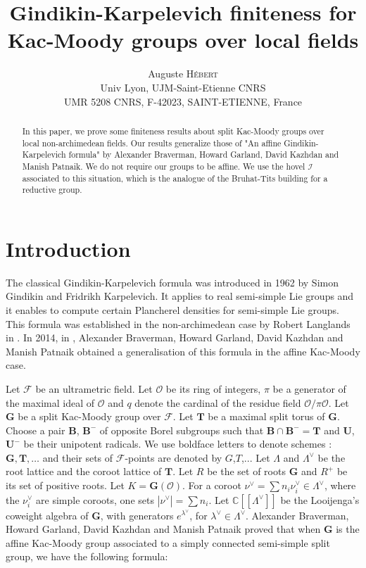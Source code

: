 \documentclass[12pt]{article}
\date{}
\title{Gindikin-Karpelevich finiteness for Kac-Moody groups over local fields}
\author{Auguste \textsc{Hébert} \\Univ Lyon, UJM-Saint-Etienne CNRS\\ UMR 5208 CNRS, F-42023, SAINT-ETIENNE, France}
\theoremstyle{plain}
\theoremstyle{definition}
\newcommand{\C}{\mathbb{C}}
\newcommand{\I}{\mathcal{I}}
\begin{document}
\maketitle



\begin{abstract}
In this paper, we prove some finiteness results about split Kac-Moody groups over  local non-archimedean fields. Our results generalize those of "An affine Gindikin-Karpelevich formula" by Alexander Braverman, Howard Garland, David Kazhdan and Manish Patnaik. We do not require our groups to be affine. We use the hovel $\I$ associated to this situation, which is the analogue of the Bruhat-Tits building for a reductive group.
\end{abstract}
 


\section{Introduction}
The classical Gindikin-Karpelevich formula was introduced in 1962 by Simon Gindikin and Fridrikh Karpelevich. It applies to real semi-simple Lie groups and it enables to compute certain Plancherel densities for semi-simple Lie groups. This formula was established in the non-archimedean case by Robert Langlands in \cite{langlands1971euler}. In 2014, in \cite{braverman2014affine}, Alexander Braverman, Howard Garland, David Kazhdan and Manish Patnaik obtained a generalisation of this formula in the affine Kac-Moody case. 


Let $\mathcal{F}$ be an ultrametric field. Let $\mathcal{O}$ be its ring of integers, $\pi$ be a generator of the maximal ideal of $\mathcal{O}$ and $q$ denote the cardinal of the residue field $\mathcal{O}/\pi \mathcal{O}$. Let $\mathbf{G}$ be a split Kac-Moody group over $\mathcal{F}$. Let $\textbf{T}$ be a maximal split torus of $\textbf{G}$. Choose
  a pair $\textbf{B}$, $\textbf{B}^-$ of opposite Borel subgroups such that
   $\textbf{B}\cap \textbf{B}^-=\textbf{T}$ and $\textbf{U}$, $\textbf{U}^-$ be their
    unipotent radicals. We use boldface letters to denote schemes : $\textbf{G},\textbf{T},\ldots$ and their sets of $\mathcal{F}$-points are denoted by $G$,$T$,...  Let $\Lambda$ and $\Lambda^\vee$ be the root lattice and the coroot lattice of $\textbf{T}$. Let $R$ be the set of roots $\textbf{G}$ and $R^+$ be its set of positive roots. Let $K=\textbf{G}(\mathcal{O})$.  For a coroot $\nu^\vee=\sum n_i\nu_i^\vee\in \Lambda^\vee$, where the $\nu_i^\vee$ are simple coroots, one sets $|\nu^\vee|=\sum n_i$. Let $\C[[\Lambda^\vee]]$ be the Looijenga's coweight algebra of $\textbf{G}$, with generators $e^{\lambda^\vee}$, for $\lambda^\vee\in \Lambda^\vee$. Alexander Braverman, Howard Garland, David Kazhdan and Manish Patnaik proved that when $\textbf{G}$ is the affine Kac-Moody group associated to a simply connected semi-simple split group, we have the following formula: 
    
\end{document}
